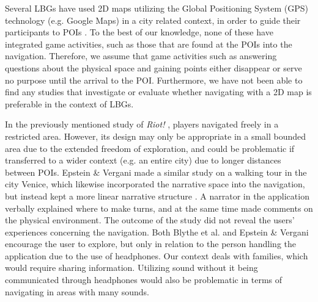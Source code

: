 Several LBGs have used 2D maps utilizing the Global Positioning System (GPS) technology (e.g. Google Maps) in a city related context, in order to guide their participants to POIs \cite{TheoreticalAndMethod, Learninggamified, knowcity, Carrigy:2010:DEP:1868914.1868929, GamingTourism, Procyk:2013:GLG:2468356.2468550, Bell:2009:ESN:1518701.1518723}. To the best of our knowledge, none of these have integrated game activities, such as those that are found at the POIs into the navigation. Therefore, we assume that game activities such as answering questions about the physical space and gaining points either disappear or serve no purpose until the arrival to the POI. Furthermore, we have not been able to find any studies that investigate or evaluate whether navigating with a 2D map is preferable in the context of LBGs.

In the previously mentioned study of \textit{Riot!} \cite{InterdisciplinaryCriticism}, players navigated freely in a restricted area. However, its design may only be appropriate in a small bounded area due to the extended freedom of exploration, and could be problematic if transferred to a wider context (e.g. an entire city) due to longer distances between POIs. Epstein \& Vergani made a similar study on a walking tour in the city Venice, which likewise incorporated the narrative space into the navigation, but instead kept a more linear narrative structure \cite{MobileTechnologies}. A narrator in the application verbally explained where to make turns, and at the same time made comments on the physical environment. The outcome of the study did not reveal the users' experiences concerning the navigation. Both Blythe et al. and Epstein \& Vergani encourage the user to explore, but only in relation to the person handling the application due to the use of headphones. Our context deals with families, which would require sharing information. Utilizing sound without it being communicated through headphones would also be problematic in terms of navigating in areas with many sounds. 


